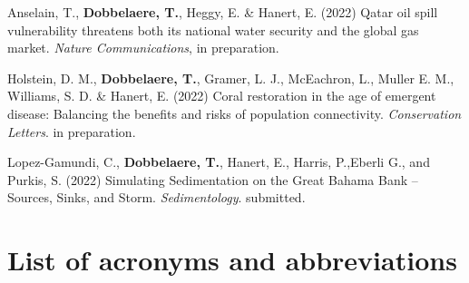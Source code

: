 \begin{list}{}{%
    \setlength{\topsep}{0pt}%
    \setlength{\leftmargin}{0.23in}%
    \setlength{\listparindent}{-0.23in}%
    \setlength{\itemindent}{-0.23in}%
    \setlength{\parsep}{\parskip}%
    }
    \item Anselain, T., \textbf{Dobbelaere, T.}, Heggy, E. \& Hanert, E. (2022) Qatar oil spill vulnerability threatens both its national water security and the global gas market. \textit{Nature Communications}, in preparation.
    
    \item Holstein, D. M., \textbf{Dobbelaere, T.}, Gramer, L. J., McEachron, L., Muller E. M., Williams, S. D. \& Hanert, E. (2022) Coral restoration in the age of emergent disease: Balancing the benefits and risks of population connectivity. \textit{Conservation Letters}. in preparation. 
    
    \item Lopez-Gamundi, C., \textbf{Dobbelaere, T.}, Hanert, E., Harris, P.,Eberli G., and Purkis, S. (2022) Simulating Sedimentation on the Great Bahama Bank – Sources, Sinks, and Storm. \textit{Sedimentology}. submitted.
    
\end{list}
\newpage 
\section{List of acronyms and abbreviations}


